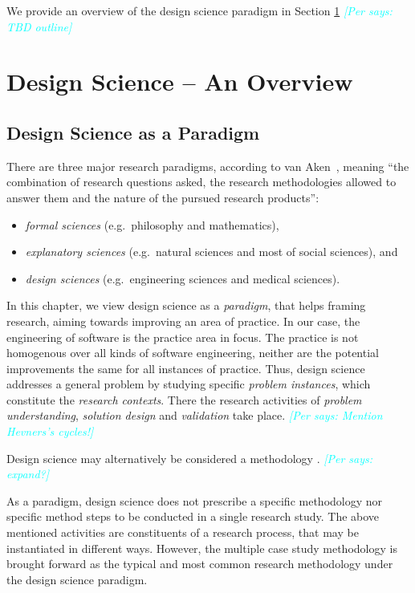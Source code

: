 \documentclass[graybox]{svmult}
\newcommand{\per}[1]{\textcolor{cyan}{{\it [Per says: #1]}}}
\newcommand{\per}[1]{}
\begin{document}
We provide an overview of the design science paradigm in Section \ref{sec:overview} \per{TBD outline}

\section{Design Science -- An Overview}
\label{sec:overview}

\subsection{Design Science as a Paradigm}

There are three major research paradigms, according to van Aken~\cite{van_aken_management_2004}, meaning ``the combination of research questions asked, the research methodologies allowed to answer them and the nature of the pursued research products'':
\begin{itemize}
\item \emph{formal sciences} (e.g.\ philosophy and mathematics), 
\item \emph{explanatory sciences} (e.g.\ natural sciences and most of social sciences), and 
\item \emph{design sciences} (e.g.\ engineering sciences and medical sciences).  
\end{itemize}

In this chapter, we view design science as a \emph{paradigm}, that helps framing research, aiming towards improving an area of practice. In our case, the engineering of software is the practice area in focus. The practice is not homogenous over all kinds of software engineering, neither are the potential improvements the same for all instances of practice. Thus, design science addresses a general problem by studying  specific \emph{problem instances}, which constitute the \emph{research contexts}.  There the research activities of \emph{problem understanding}, \emph{solution design} and \emph{validation} take place. \per{Mention Hevners's cycles!}

Design science may alternatively be considered a methodology \cite{Wohlin2015}. \per{expand?}

As a paradigm, design science does not prescribe a specific methodology nor specific method steps to be conducted in a single research study. The above mentioned activities are constituents of  a research process, that may be instantiated in different ways. However, the multiple case study methodology is brought forward as the typical and most common research methodology under the design science paradigm.
\end{document}
